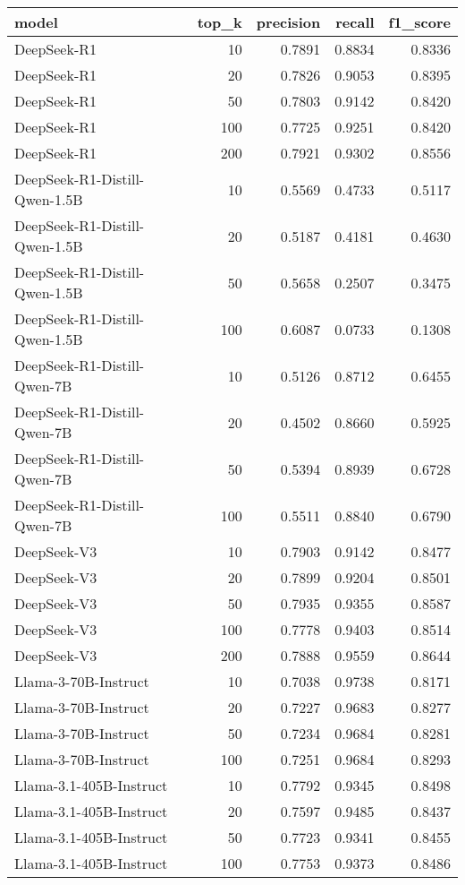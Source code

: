 \begin{tabular}{lrrrr}
\toprule
model & top_k & precision & recall & f1_score \\
\midrule
DeepSeek-R1 & 10 & 0.7891 & 0.8834 & 0.8336 \\
DeepSeek-R1 & 20 & 0.7826 & 0.9053 & 0.8395 \\
DeepSeek-R1 & 50 & 0.7803 & 0.9142 & 0.8420 \\
DeepSeek-R1 & 100 & 0.7725 & 0.9251 & 0.8420 \\
DeepSeek-R1 & 200 & 0.7921 & 0.9302 & 0.8556 \\
DeepSeek-R1-Distill-Qwen-1.5B & 10 & 0.5569 & 0.4733 & 0.5117 \\
DeepSeek-R1-Distill-Qwen-1.5B & 20 & 0.5187 & 0.4181 & 0.4630 \\
DeepSeek-R1-Distill-Qwen-1.5B & 50 & 0.5658 & 0.2507 & 0.3475 \\
DeepSeek-R1-Distill-Qwen-1.5B & 100 & 0.6087 & 0.0733 & 0.1308 \\
DeepSeek-R1-Distill-Qwen-7B & 10 & 0.5126 & 0.8712 & 0.6455 \\
DeepSeek-R1-Distill-Qwen-7B & 20 & 0.4502 & 0.8660 & 0.5925 \\
DeepSeek-R1-Distill-Qwen-7B & 50 & 0.5394 & 0.8939 & 0.6728 \\
DeepSeek-R1-Distill-Qwen-7B & 100 & 0.5511 & 0.8840 & 0.6790 \\
DeepSeek-V3 & 10 & 0.7903 & 0.9142 & 0.8477 \\
DeepSeek-V3 & 20 & 0.7899 & 0.9204 & 0.8501 \\
DeepSeek-V3 & 50 & 0.7935 & 0.9355 & 0.8587 \\
DeepSeek-V3 & 100 & 0.7778 & 0.9403 & 0.8514 \\
DeepSeek-V3 & 200 & 0.7888 & 0.9559 & 0.8644 \\
Llama-3-70B-Instruct & 10 & 0.7038 & 0.9738 & 0.8171 \\
Llama-3-70B-Instruct & 20 & 0.7227 & 0.9683 & 0.8277 \\
Llama-3-70B-Instruct & 50 & 0.7234 & 0.9684 & 0.8281 \\
Llama-3-70B-Instruct & 100 & 0.7251 & 0.9684 & 0.8293 \\
Llama-3.1-405B-Instruct & 10 & 0.7792 & 0.9345 & 0.8498 \\
Llama-3.1-405B-Instruct & 20 & 0.7597 & 0.9485 & 0.8437 \\
Llama-3.1-405B-Instruct & 50 & 0.7723 & 0.9341 & 0.8455 \\
Llama-3.1-405B-Instruct & 100 & 0.7753 & 0.9373 & 0.8486 \\

\end{tabular}

